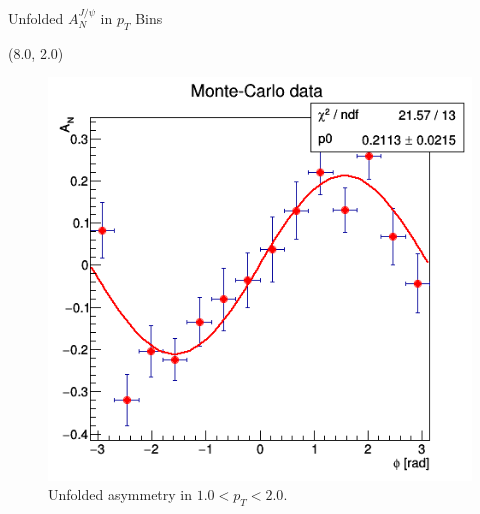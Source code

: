 \documentclass[11pt, xcolor={dvipsnames}, aspectratio = 169]{beamer}
\begin{document}
\begin{frame}{Unfolded $A^{J/\psi}_{N}$ in $p_{T}$ Bins}
\begin{textblock}{7.0}(8.0, 2.0)
\begin{figure}
    \centering
    \includegraphics[width = 1.0\linewidth]{imgs/sigal_asym1.png}
    \caption{Unfolded asymmetry in $1.0 < p_{T} < 2.0$.}
\end{figure}
\end{textblock}

\end{frame}
\end{document}
